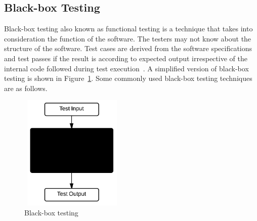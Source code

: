 \subsection{Black-box Testing}
Black-box testing also known as functional testing is a technique that takes into consideration the function of the software. The testers may not know about the structure of the software. Test cases are derived from the software specifications and test passes if the result is according to expected output irrespective of the internal code followed during test execution~\cite{beizer1995black}. A simplified version of black-box testing is shown in Figure~\ref{fig:blackBox}. Some commonly used black-box testing techniques are as follows.

\bigskip
\begin{figure}[h]
\begin{center}
	\includegraphics[width=5cm, height=5.5cm ]{chapter2/blackBox.png}
	\bigskip
	\caption{Black-box testing}
 	\label{fig:blackBox}
\end{center}  
\end{figure}
\bigskip



